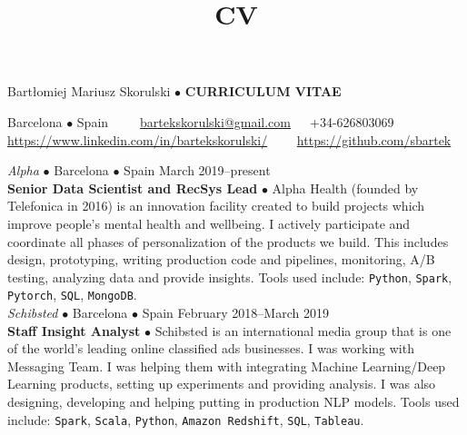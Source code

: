 \documentclass[a4paper, oneside]{scrreprt}
\title{CV}
\author{}
\date{}
\begin{document}
\vspace{0.4cm}
\noindent Bartłomiej Mariusz Skorulski $\bullet$ \textbf{CURRICULUM VITAE}

\vspace{-0.3cm}
\noindent\makebox[\linewidth]{\rule{\textwidth}{0.4pt}}

\noindent\llap{\FA \faHome\ \ } Barcelona $\bullet$ Spain\ \
{\FA \faEnvelope\ \ }\ \href{mailto:bartekskorulski@gmail.com}{bartekskorulski@gmail.com}\ \ 
{\FA \faMobilePhone}\  +34-626803069\\
\noindent\llap{\FA \faLinkedin\ \ } 
\href{https://www.linkedin.com/in/bartekskorulski/}{https://www.linkedin.com/in/bartekskorulski/}\ \ 
{\FA \faGithub\ \ } \href{https://github.com/sbartek}{https://github.com/sbartek}

\vspace{-0.3cm}
\noindent\makebox[\linewidth]{\rule{\textwidth}{0.4pt}}
\vspace{-0.2cm}
\marginpar{
  \sectit{Main Professional Experience}
}

\vspace{-0.3cm}
\noindent{}
\hspace{-0.15cm}\textit{Alpha} $\bullet$ 
Barcelona $\bullet$ Spain \hfill March 2019--present\\
\noindent\textbf{\small Senior Data Scientist and RecSys Lead} $\bullet$ 
{\small Alpha Health (founded by Telefonica in 2016) is an innovation facility created to build
  projects which improve people's mental health and wellbeing. I actively participate and coordinate
  all phases of personalization of the products we build. This includes design,
  prototyping, writing production code and pipelines, monitoring, A/B testing, analyzing data and
  provide insights. Tools used include: \texttt{Python}, \texttt{Spark}, \texttt{Pytorch},  \texttt{SQL},
  \texttt{MongoDB}. }\\

\vspace{-0.3cm}
\noindent{}
\hspace{-0.15cm}\textit{Schibsted} $\bullet$ 
Barcelona $\bullet$ Spain \hfill February 2018--March 2019\\
\noindent\textbf{\small Staff Insight Analyst } $\bullet$ 
{\small Schibsted is an international media group that is one of the world’s leading online
  classified ads businesses.  I was working with Messaging Team. I was helping them with integrating
  Machine Learning/Deep Learning products, setting up experiments and providing analysis. I was also
  designing, developing and helping putting in production NLP models. Tools used include:
  \texttt{Spark}, \texttt{Scala}, \texttt{Python}, 
  \texttt{Amazon Redshift}, \texttt{SQL}, \texttt{Tableau}. }\\
\end{document}
